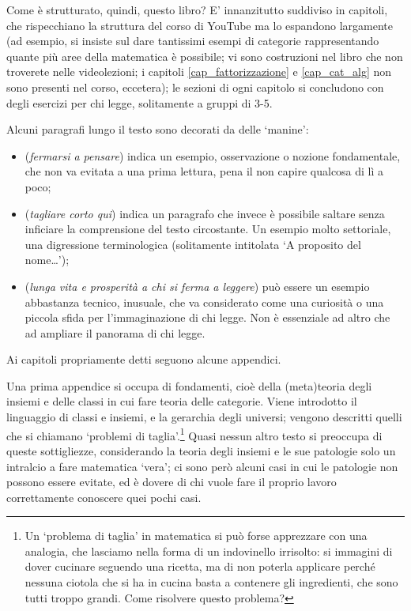 \medskip
Come è strutturato, quindi, questo libro? E' innanzitutto suddiviso in capitoli, che rispecchiano la struttura del corso di YouTube ma lo espandono largamente (ad esempio, si insiste sul dare tantissimi esempi di categorie rappresentando quante più aree della matematica è possibile; vi sono costruzioni nel libro che non troverete nelle videolezioni; i capitoli \ref{cap_fattorizzazione} e \ref{cap_cat_alg} non sono presenti nel corso, eccetera); le sezioni di ogni capitolo si concludono con degli esercizi per chi legge, solitamente a gruppi di 3-5.

Alcuni paragrafi lungo il testo sono decorati da delle `manine':
\begin{itemize}
 \item {} (\emph{fermarsi a pensare}) indica un esempio, osservazione o nozione fondamentale, che non va evitata a una prima lettura, pena il non capire qualcosa di lì a poco;
 \item {} (\emph{tagliare corto qui}) indica un paragrafo che invece è possibile saltare senza inficiare la comprensione del testo circostante. Un esempio molto settoriale, una digressione terminologica (solitamente intitolata `A proposito del nome\dots');
 \item {} (\emph{lunga vita e prosperità a chi si ferma a leggere}) può essere un esempio abbastanza tecnico, inusuale, che va considerato come una curiosità o una piccola sfida per l'immaginazione di chi legge. Non è essenziale ad altro che ad ampliare il panorama di chi legge.
\end{itemize}
Ai capitoli propriamente detti seguono alcune appendici.

\medskip
Una prima appendice si occupa di fondamenti, cioè della (meta)teoria degli insiemi e delle classi in cui fare teoria delle categorie. Viene introdotto il linguaggio di classi e insiemi, e la gerarchia degli universi; vengono descritti quelli che si chiamano `problemi di taglia'.\footnote{Un `problema di taglia' in matematica si può forse apprezzare con una analogia, che lasciamo nella forma di un indovinello irrisolto: si immagini di dover cucinare seguendo una ricetta, ma di non poterla applicare perché nessuna ciotola che si ha in cucina basta a contenere gli ingredienti, che sono tutti troppo grandi. Come risolvere questo problema?} Quasi nessun altro testo si preoccupa di queste sottigliezze, considerando la teoria degli insiemi e le sue patologie solo un intralcio a fare matematica `vera'; ci sono però alcuni casi in cui le patologie non possono essere evitate, ed è dovere di chi vuole fare il proprio lavoro correttamente conoscere quei pochi casi.

